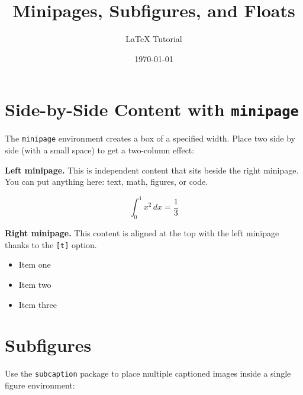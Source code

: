 \documentclass[12pt]{article}
\title{Minipages, Subfigures, and Floats}
\author{LaTeX Tutorial}
\date{\today}
\begin{document}
\maketitle

\section{Side-by-Side Content with \texttt{minipage}}

The \texttt{minipage} environment creates a box of a specified width.
Place two side by side (with a small space) to get a two-column effect:

\noindent
\begin{minipage}[t]{0.48\textwidth}
\textbf{Left minipage.} This is independent content that sits beside the
right minipage. You can put anything here: text, math, figures, or code.

\[
    \int_0^1 x^2\,dx = \frac{1}{3}
\]
\end{minipage}%
\hfill
\begin{minipage}[t]{0.48\textwidth}
\textbf{Right minipage.} This content is aligned at the top with the left
minipage thanks to the \texttt{[t]} option.

\begin{itemize}
    \item Item one
    \item Item two
    \item Item three
\end{itemize}
\end{minipage}

\section{Subfigures}

Use the \texttt{subcaption} package to place multiple captioned images
inside a single figure environment:
\end{document}
